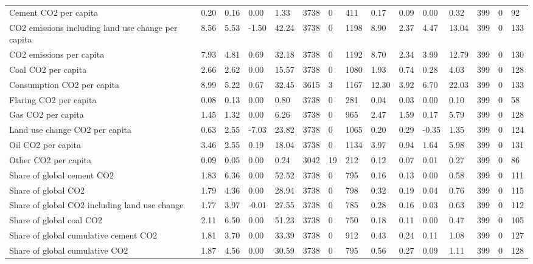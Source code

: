 \begin{longtable}{lllllllllllllll}
Cement CO2 per capita & 0.20 & 0.16 & 0.00 & 1.33 & 3738 & 0 & 411 & 0.17 & 0.09 & 0.00 & 0.32 & 399 & 0 & 92\\
CO2 emissions including land use change per capita & 8.56 & 5.53 & -1.50 & 42.24 & 3738 & 0 & 1198 & 8.90 & 2.37 & 4.47 & 13.04 & 399 & 0 & 133\\
CO2 emissions per capita & 7.93 & 4.81 & 0.69 & 32.18 & 3738 & 0 & 1192 & 8.70 & 2.34 & 3.99 & 12.79 & 399 & 0 & 130\\
Coal CO2 per capita & 2.66 & 2.62 & 0.00 & 15.57 & 3738 & 0 & 1080 & 1.93 & 0.74 & 0.28 & 4.03 & 399 & 0 & 128\\
\addlinespace
Consumption CO2 per capita & 8.99 & 5.22 & 0.67 & 32.45 & 3615 & 3 & 1167 & 12.30 & 3.92 & 6.70 & 22.03 & 399 & 0 & 133\\
Flaring CO2 per capita & 0.08 & 0.13 & 0.00 & 0.80 & 3738 & 0 & 281 & 0.04 & 0.03 & 0.00 & 0.10 & 399 & 0 & 58\\
Gas CO2 per capita & 1.45 & 1.32 & 0.00 & 6.26 & 3738 & 0 & 965 & 2.47 & 1.59 & 0.17 & 5.79 & 399 & 0 & 128\\
Land use change CO2 per capita & 0.63 & 2.55 & -7.03 & 23.82 & 3738 & 0 & 1065 & 0.20 & 0.29 & -0.35 & 1.35 & 399 & 0 & 124\\
Oil CO2 per capita & 3.46 & 2.55 & 0.19 & 18.04 & 3738 & 0 & 1134 & 3.97 & 0.94 & 1.64 & 5.98 & 399 & 0 & 131\\
\addlinespace
Other CO2 per capita & 0.09 & 0.05 & 0.00 & 0.24 & 3042 & 19 & 212 & 0.12 & 0.07 & 0.01 & 0.27 & 399 & 0 & 86\\
Share of global cement CO2 & 1.83 & 6.36 & 0.00 & 52.52 & 3738 & 0 & 795 & 0.16 & 0.13 & 0.00 & 0.58 & 399 & 0 & 111\\
Share of global CO2 & 1.79 & 4.36 & 0.00 & 28.94 & 3738 & 0 & 798 & 0.32 & 0.19 & 0.04 & 0.76 & 399 & 0 & 115\\
Share of global CO2 including land use change & 1.77 & 3.97 & -0.01 & 27.55 & 3738 & 0 & 785 & 0.28 & 0.16 & 0.03 & 0.63 & 399 & 0 & 112\\
Share of global coal CO2 & 2.11 & 6.50 & 0.00 & 51.23 & 3738 & 0 & 750 & 0.18 & 0.11 & 0.00 & 0.47 & 399 & 0 & 105\\
\addlinespace
Share of global cumulative cement CO2 & 1.81 & 3.70 & 0.00 & 33.39 & 3738 & 0 & 912 & 0.43 & 0.24 & 0.11 & 1.08 & 399 & 0 & 127\\
Share of global cumulative CO2 & 1.87 & 4.56 & 0.00 & 30.59 & 3738 & 0 & 795 & 0.56 & 0.27 & 0.09 & 1.11 & 399 & 0 & 128\\

\end{longtable}
